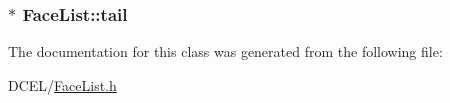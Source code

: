 \subsubsection[{\texorpdfstring{tail}{tail}}]{$\ast$ Face\+List\+::tail}\hypertarget{classFaceList_a013acfbf783cd5b9a036981a8c747f7d}{}\label{classFaceList_a013acfbf783cd5b9a036981a8c747f7d}


The documentation for this class was generated from the following file\+:\begin{DoxyCompactItemize}
\item 
D\+C\+E\+L/\hyperlink{FaceList_8h}{Face\+List.\+h}\end{DoxyCompactItemize}
